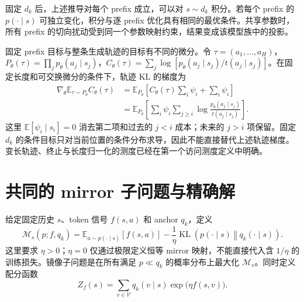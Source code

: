 \documentclass[lang=cn,scheme=chinese,openany]{../book/elegantbook}
\newcommand{\E}{\mathbb E}
\begin{document}
固定 $d_k$ 后，上述推导对每个 prefix 成立，可以对 $s\sim d_k$ 积分。若每个 prefix 的 $p(\cdot\mid s)$ 可独立变化，积分与逐 prefix 优化具有相同的最优条件。共享参数时，所有 prefix 的切向扰动受到同一个参数映射约束，结果变成该模型族中的投影。

固定 prefix 目标与整条生成轨迹的目标有不同的微分。令 $\tau=(a_1,\ldots,a_H)$，$P_\theta(\tau)=\prod_jp_\theta(a_j\mid s_j)$，$C_\theta(\tau)=\sum_j\log[p_\theta(a_j\mid s_j)/t(a_j\mid s_j)]$。在固定长度和可交换微分的条件下，轨迹 KL 的梯度为
\begin{align}
\nabla_\theta\E_{\tau\sim P_\theta}C_\theta(\tau)
&=\E_{P_\theta}\left[C_\theta(\tau)\sum_i\psi_i+\sum_i\psi_i\right]\\
&=\E_{P_\theta}\left[\sum_i\psi_i\sum_{j\ge i}
\log\frac{p_\theta(a_j\mid s_j)}{t(a_j\mid s_j)}\right].
\end{align}
这里 $\E[\psi_i\mid s_i]=0$ 消去第二项和过去的 $j<i$ 成本；未来的 $j>i$ 项保留。固定 $d_k$ 的条件目标只对当前位置的条件分布求导，因此不能直接替代上述轨迹梯度。变长轨迹、终止与长度归一化的测度已经在第一个访问测度定义中明确。



\section{共同的 mirror 子问题与精确解}
\label{sec:ch2-common}

\begin{definition}
\label{def:ch2-mirror-subproblem}
给定固定历史 $s$、token 信号 $f(s,a)$ 和 anchor $ q_k$，定义
\begin{equation}
\label{eq:ch2-mirror}
\mathcal M_s(p;f, q_k)
=\mathbb E_{a\sim p(\cdot\mid s)}[f(s,a)]
-\frac1\eta\operatorname{KL}\!\left(p(\cdot\mid s)\middle\Vert q_k(\cdot\mid s)\right).
\end{equation}
这里要求 $\eta>0$；$\eta=0$ 仅通过极限定义恒等 mirror 映射，不能直接代入含 $1/\eta$ 的训练损失。镜像子问题是在所有满足 $p\ll q_k$ 的概率分布上最大化 $\mathcal M_s$。同时定义配分函数
\begin{equation}
\label{eq:ch2-mirror-normalizer}
Z_f(s)=\sum_{v\in\mathcal V} q_k(v\mid s)\exp\!\bigl(\eta f(s,v)\bigr).
\end{equation}
\end{definition}
\end{document}
